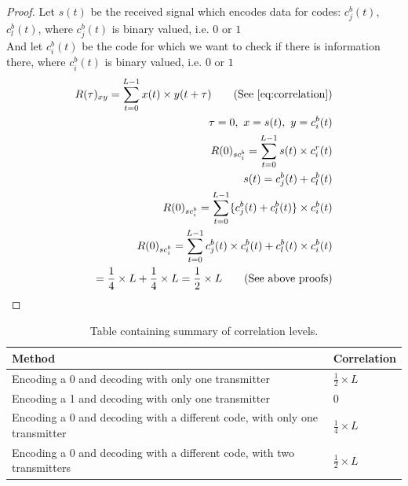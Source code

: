 		\begin{proof}
			Let $s(t)$ be the received signal which encodes data for codes: $c^b_j(t)$, $c^b_l(t)$, where $c^b_j(t)$ is binary valued, i.e. $0$ or $1$\\
			And let $c^b_i(t)$ be the code for which we want to check if there is information there, where $c^b_i(t)$ is binary valued, i.e. $0$ or $1$ \\

			\begin{align*}
				R(\tau)_{xy} = \displaystyle\sum_{t = 0} ^ {L - 1} x(t) \times y(t + \tau)	\tag{See \autoref{eq:correlation}}
				\\ \tau = 0,\ x = s(t),\ y = c^b_i(t)	
				\\ R(0)_{sc^b_{i}} = \displaystyle\sum_{t = 0} ^ {L - 1} s(t) \times c^r_i(t)	
				\\ s(t) = c^b_j(t) + c^b_l(t)														
				\\ R(0)_{sc^b_{i}} = \displaystyle\sum_{t = 0} ^ {L - 1} \{ c^b_j(t) + c^b_l(t) \} \times c^b_i(t)
				\\ R(0)_{sc^b_{i}} = \displaystyle\sum_{t = 0} ^ {L - 1} c^b_j(t) \times c^b_i(t) + c^b_l(t) \times c^b_i(t)
				\\ = \frac{1}{4} \times L + \frac{1}{4} \times L = \frac{1}{2} \times L \tag{See above proofs}
			\end{align*}

		\end{proof}



		\begin{table}[h!]
			\centering
			
			\begin{tabular}{| l | l |}
				\hline
				Method												& Correlation \\ \hline \hline
				Encoding a 0 and decoding with only one transmitter 							& $\frac{1}{2} \times L$  \\ \hline
				Encoding a 1 and decoding with only one transmitter 							& $ 0 $   \\ \hline
				Encoding a 0 and decoding with a different code, with only one transmitter 		& $\frac{1}{4} \times L$  \\ \hline
				Encoding a 0 and decoding with a different code, with two transmitters			& $\frac{1}{2} \times L$  \\ \hline
			\end{tabular}
			\caption{Table containing summary of correlation levels.}
			\label{tbl:correlation-levels-bin}
		\end{table}

